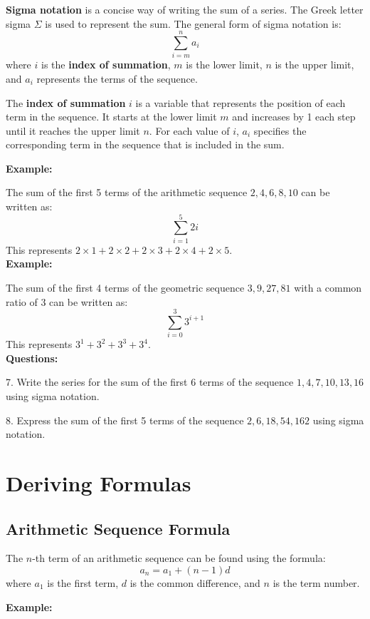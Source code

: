 \documentclass[12pt]{article}
\begin{document}
\textbf{Sigma notation} is a concise way of writing the sum of a series. The Greek letter sigma \(\Sigma\) is used to represent the sum. The general form of sigma notation is:
\[
\sum_{i=m}^{n} a_i
\]
where \(i\) is the \textbf{index of summation}, \(m\) is the lower limit, \(n\) is the upper limit, and \(a_i\) represents the terms of the sequence. 

The \textbf{index of summation} \(i\) is a variable that represents the position of each term in the sequence. It starts at the lower limit \(m\) and increases by 1 each step until it reaches the upper limit \(n\). For each value of \(i\), \(a_i\) specifies the corresponding term in the sequence that is included in the sum.

\textbf{Example:}

The sum of the first 5 terms of the arithmetic sequence \(2, 4, 6, 8, 10\) can be written as:
\[
\sum_{i=1}^{5} 2i
\]
This represents \(2 \times 1 + 2 \times 2 + 2 \times 3 + 2 \times 4 + 2 \times 5\).\\

\textbf{Example:}

The sum of the first 4 terms of the geometric sequence \(3, 9, 27, 81\) with a common ratio of 3 can be written as:
\[
\sum_{i=0}^{3} 3^{i+1}
\]
This represents \(3^1 + 3^2 + 3^3 + 3^4\).\\

\textbf{Questions:}

7. Write the series for the sum of the first 6 terms of the sequence \(1, 4, 7, 10, 13, 16\) using sigma notation.

8. Express the sum of the first 5 terms of the sequence \(2, 6, 18, 54, 162\) using sigma notation.

\newpage

\section*{Deriving Formulas}

\subsection*{Arithmetic Sequence Formula}

The \(n\)-th term of an arithmetic sequence can be found using the formula:
\[
a_n = a_1 + (n-1)d
\]
where \(a_1\) is the first term, \(d\) is the common difference, and \(n\) is the term number.

\textbf{Example:}
\end{document}
